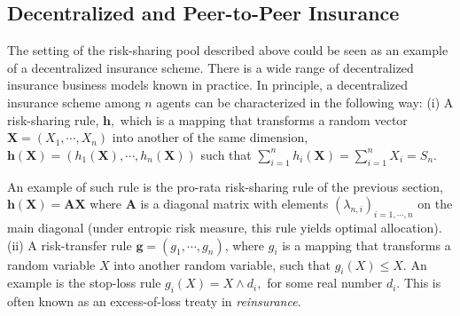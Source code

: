\documentclass[fleqn,mnsc,nonblindrev]{informs4}
\begin{document}
\subsection{Decentralized and Peer-to-Peer Insurance} \label{sec:dein}

The setting of the risk-sharing pool described above could be seen as an example of a decentralized insurance scheme. There is a wide range of decentralized insurance business models known in practice. In principle, a decentralized insurance scheme among $n$ agents can be characterized in the following way: 
(i) A risk-sharing rule, $\mathbf{h},$ which is a mapping that transforms a random vector $\mathbf{X}=(X_1, \cdots, X_n)$ into another of the same dimension, $\mathbf{h}(\mathbf{X})=(h_1(\mathbf{X}), \cdots, h_n(\mathbf{X}))$ such that $\sum^n_{i=1} h_i(\mathbf{X})=\sum^n_{i=1}X_i=S_n.$ 

An example of such rule is the pro-rata risk-sharing rule of the previous section, $\mathbf{h}(\mathbf{X})=\mathbf{A}\mathbf{X}$ where $\mathbf{A}$ is a diagonal matrix with elements $(\lambda_{n,i})_{i=1,\cdots,n}$ on the main diagonal (under entropic risk measure, this rule yields optimal allocation). (ii) A risk-transfer rule $\mathbf{g}=(g_1,\cdots,g_n)$, where $g_i$ is a mapping that transforms a random variable $X$ into another random variable, such that $g_i(X)\le X.$ An example is the stop-loss rule $g_i(X)=X\wedge d_i,$ for some real number $d_i.$ This is often known as an excess-of-loss treaty in \textit{reinsurance}. 
\end{document}

